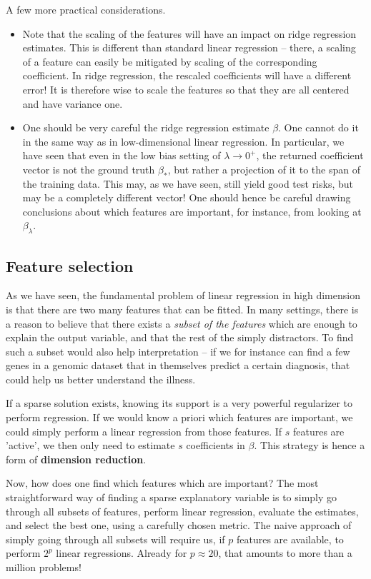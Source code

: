 \documentclass{article}
\begin{document}
A few more practical considerations.
\begin{itemize}
    \item Note that the scaling of the features will have an impact on ridge regression estimates. This is different than standard linear regression -- there, a scaling of a feature can easily be mitigated by scaling of the corresponding coefficient. In ridge regression, the rescaled coefficients will have a different error! It is therefore wise to scale the features so that they are all centered and have variance one.
    \item One should be very careful  the ridge regression estimate  $\beta$. One cannot do it in the same way as in low-dimensional linear regression. In particular, we have seen that even in the low bias setting of $\lambda\to 0^+$, the returned coefficient vector is not the ground truth $\beta_*$, but rather a projection of it to the span of the training data. This may, as we have seen, still yield good test risks, but may be a completely different vector! One should hence be careful drawing conclusions about which features are important, for instance, from looking at $\beta_\lambda$.
\end{itemize}

\subsection{Feature selection}
As we have seen, the fundamental problem of linear regression in high dimension is that there are two many features that can be fitted. In many settings, there is a reason to believe that there exists a \emph{subset of the features} which are enough to explain the output variable, and that the rest of the simply distractors. To find such a subset would also help interpretation -- if we for instance can find a few genes in a genomic dataset that in themselves predict a certain diagnosis, that could help us better understand the illness.

If a sparse solution exists, knowing its support is a very powerful regularizer to perform regression. If we would know a priori which features are important, we could simply perform a linear regression from those features. If $s$ features are 'active', we then only need to estimate $s$ coefficients in $\beta.$
This strategy is hence a form of \textbf{dimension reduction}.

Now, how does one find which features which are important? The most straightforward way of finding a sparse explanatory variable is to simply go through all subsets of features, perform linear regression, evaluate the estimates, and select the best one, using a carefully chosen metric. The naive approach of simply going through all subsets will require us, if $p$ features are available, to perform $2^p$ linear regressions. Already for $p\approx 20$, that amounts to more than a million problems! 
\end{document}
